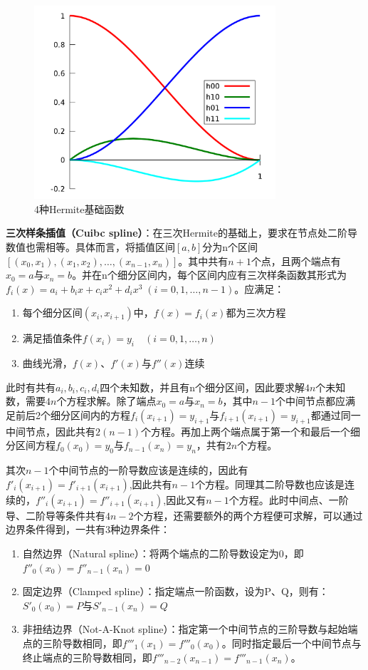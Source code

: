 \documentclass[11pt]{article}
\begin{document}
\begin{figure}[H]
    \centering
    \includegraphics[width=0.8\textwidth]{fig/hermite-spline.png}
	\caption{4种Hermite基础函数}
    \label{fig:herminte-spline}
\end{figure}

\textbf{三次样条插值（Cuibc spline）}：在三次Hermite的基础上，要求在节点处二阶导数值也需相等。具体而言，将插值区间$[a,b]$分为n个区间$[(x_0,x_1),(x_1,x_2),\dots,(x_{n-1},x_n)]$。其中共有$n+1$个点，且两个端点有$x_0=a$与$x_n=b$。并在n个细分区间内，每个区间内应有三次样条函数其形式为$f_i(x) = a_i+b_i x+c_i x^2+d_i x^3\;(i=0,1,\dots,n-1)$。应满足：
\begin{enumerate}
    \item 每个细分区间$(x_i,x_{i+1})$中，$f(x)=f_i(x)$都为三次方程
    \item 满足插值条件$f(x_i) = y_i \quad (i=0,1,\dots,n)$
    \item 曲线光滑，$f(x)$、$f'(x)$与$f''(x)$连续
\end{enumerate}

此时有共有$a_i,b_i,c_i,d_i$四个未知数，并且有n个细分区间，因此要求解$4n$个未知数，需要$4n$个方程求解。除了端点$x_0=a$与$x_n=b$，其中$n-1$个中间节点都应满足前后2个细分区间内的方程$f_i(x_{i+1})=y_{i+1}$与$f_{i+1}(x_{i+1})=y_{i+1}$都通过同一中间节点，因此共有$2(n-1)$个方程。再加上两个端点属于第一个和最后一个细分区间方程$f_0(x_0)=y_0$与$f_{n-1}(x_n)=y_n$，共有$2n$个方程。

其次$n-1$个中间节点的一阶导数应该是连续的，因此有$f'_i(x_{i+1}) = f'_{i+1}(x_{i+1})$,因此共有$n-1$个方程。同理其二阶导数也应该是连续的，$f''_i(x_{i+1}) = f''_{i+1}(x_{i+1})$,因此又有$n-1$个方程。此时中间点、一阶导、二阶导等条件共有$4n-2$个方程，还需要额外的两个方程便可求解，可以通过边界条件得到，一共有3种边界条件：
\begin{enumerate}
    \item 自然边界（Natural spline）：将两个端点的二阶导数设定为0，即$f''_0(x_0)=f''_{n-1}(x_n)=0$
    \item 固定边界（Clamped spline）：指定端点一阶函数，设为P、Q，则有：$S'_0(x_0)=P$与$S'_{n-1}(x_n)=Q$
    \item 非扭结边界（Not-A-Knot spline）：指定第一个中间节点的三阶导数与起始端点的三阶导数相同，即$f'''_1(x_1)=f'''_0(x_0)$。同时指定最后一个中间节点与终止端点的三阶导数相同，即$f'''_{n-2}(x_{n-1})=f'''_{n-1}(x_n)$。
\end{enumerate}
\end{document}
